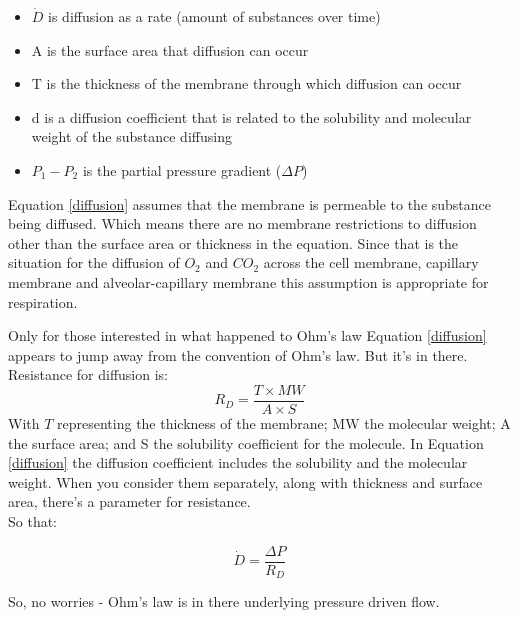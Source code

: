 \begin{itemize}
    \item $\dot{D}$ is diffusion as a rate (amount of substances over time)
    \item A is the surface area that diffusion can occur
    \item T is the thickness of the membrane through which diffusion can occur
    \item d is a diffusion coefficient that is related to the solubility and molecular weight of the substance diffusing
    \item $P_1 - P_2$ is the partial pressure gradient ($\Delta P$)
\end{itemize}

Equation \ref{diffusion} assumes that the membrane is permeable to the substance being diffused. Which means there are no membrane restrictions to diffusion other than the surface area or thickness in the equation. Since that is the situation for the diffusion of $O_2$ and $CO_2$ across the cell membrane, capillary membrane and alveolar-capillary membrane this assumption is appropriate for respiration.\footnotemark{}

\begin{tips}{Only for those interested in what happened to Ohm's law}
    Equation \ref{diffusion} appears to jump away from the convention of Ohm's law. But it's in there. \\ Resistance for diffusion is:
    \begin{equation}
    R_D = \frac{T \times MW}{A \times S}
    \label{diffusion-resistance}
\end{equation}
With $T$ representing the thickness of the membrane; MW the molecular weight; A the surface area; and S the solubility coefficient for the molecule. In Equation \ref{diffusion} the diffusion coefficient includes the solubility and the molecular weight. When you consider them separately, along with thickness and surface area, there's a parameter for resistance. \\ So that:

\begin{equation}
    \dot{D} = \frac{\Delta P}{R_D}
    \label{diffusion_ohms}
\end{equation}

    So, no worries - Ohm's law is in there underlying pressure driven flow. 
\end{tips}

